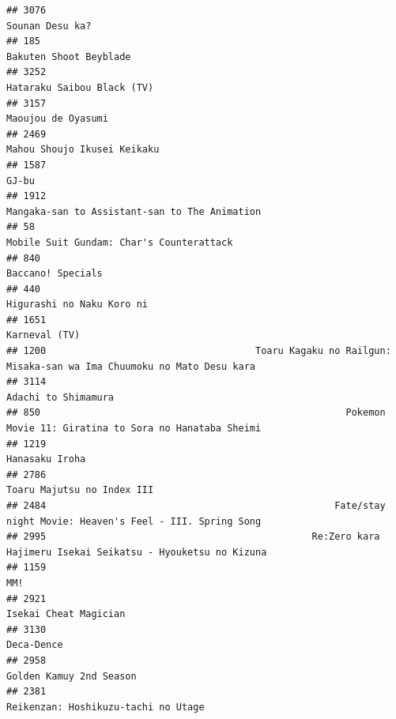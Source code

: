 \documentclass[
]{article}
\begin{document}
\begin{verbatim}
## 3076                                                                                           Sounan Desu ka?
## 185                                                                                     Bakuten Shoot Beyblade
## 3252                                                                                Hataraku Saibou Black (TV)
## 3157                                                                                        Maoujou de Oyasumi
## 2469                                                                               Mahou Shoujo Ikusei Keikaku
## 1587                                                                                                     GJ-bu
## 1912                                                             Mangaka-san to Assistant-san to The Animation
## 58                                                                    Mobile Suit Gundam: Char's Counterattack
## 840                                                                                          Baccano! Specials
## 440                                                                                  Higurashi no Naku Koro ni
## 1651                                                                                             Karneval (TV)
## 1200                                     Toaru Kagaku no Railgun: Misaka-san wa Ima Chuumoku no Mato Desu kara
## 3114                                                                                       Adachi to Shimamura
## 850                                                      Pokemon Movie 11: Giratina to Sora no Hanataba Sheimi
## 1219                                                                                            Hanasaku Iroha
## 2786                                                                                Toaru Majutsu no Index III
## 2484                                                   Fate/stay night Movie: Heaven's Feel - III. Spring Song
## 2995                                               Re:Zero kara Hajimeru Isekai Seikatsu - Hyouketsu no Kizuna
## 1159                                                                                                       MM!
## 2921                                                                                     Isekai Cheat Magician
## 3130                                                                                                Deca-Dence
## 2958                                                                                   Golden Kamuy 2nd Season
## 2381                                                                       Reikenzan: Hoshikuzu-tachi no Utage

\end{verbatim}
\end{document}
